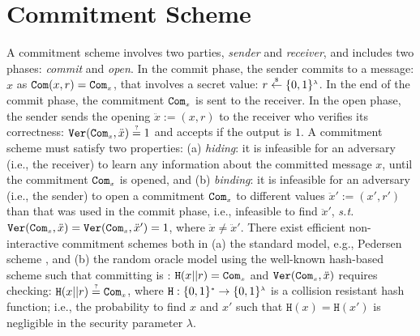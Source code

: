 


\section{Commitment Scheme}\label{subsec:commit-long}


 A commitment scheme involves two parties,  \emph{sender} and  \emph{receiver}, and includes  two phases: \emph{commit} and  \emph{open}. In the commit phase, the sender  commits to a message: $x$ as $\mathtt{Com}(x,r)=\mathtt{Com}_{\scriptscriptstyle x}$, that involves a secret value: $r\stackrel{\scriptscriptstyle\$}\leftarrow \{0,1\}^{\scriptscriptstyle\lambda}$. In the end of the commit phase,  the commitment $\mathtt{Com}_{\scriptscriptstyle x}$ is sent to the receiver. In the open phase, the sender sends the opening $\ddot{x}:=(x,r)$ to the receiver who verifies its correctness: $\mathtt{Ver}(\mathtt{Com}_{\scriptscriptstyle x},\ddot{x})\stackrel{\scriptscriptstyle ?}=1$ and accepts if the output is $1$.  A commitment scheme must satisfy two properties: (a) \textit{hiding}: it is infeasible for an adversary (i.e., the receiver) to learn any information about the committed  message $x$, until the commitment $\mathtt{Com}_{\scriptscriptstyle x}$ is opened, and (b) \textit{binding}: it is infeasible for an adversary (i.e., the sender) to open a commitment $\mathtt{Com}_{\scriptscriptstyle x}$ to different values $\ddot{x}':=(x',r')$ than that was  used in the commit phase, i.e., infeasible to find  $\ddot{x}'$, \textit{s.t.} $\mathtt{Ver}(\mathtt{Com}_{\scriptscriptstyle x},\ddot{x})=\mathtt{Ver}(\mathtt{Com}_{\scriptscriptstyle x},\ddot{x}')=1$, where $\ddot{x}\neq \ddot{x}'$.  There exist efficient non-interactive  commitment schemes both in (a) the standard model, e.g., Pedersen scheme \cite{Pedersen91}, and (b)  the random oracle model using the well-known hash-based scheme such that committing  is : $\mathtt{H}(x||r)=\mathtt{Com}_{\scriptscriptstyle x}$ and $\mathtt{Ver}(\mathtt{Com}_{\scriptscriptstyle x},\ddot{x})$ requires checking: $\mathtt{H}(x||r)\stackrel{\scriptscriptstyle ?}=\mathtt{Com}_{\scriptscriptstyle x}$, where $\mathtt{H}:\{0,1\}^{\scriptscriptstyle *}\rightarrow \{0,1\}^{\scriptscriptstyle\lambda}$ is a collision resistant hash function; i.e., the probability to find $x$ and $x'$ such that $\mathtt{H}(x)=\mathtt{H}(x')$ is negligible in the security parameter $\lambda$.
 